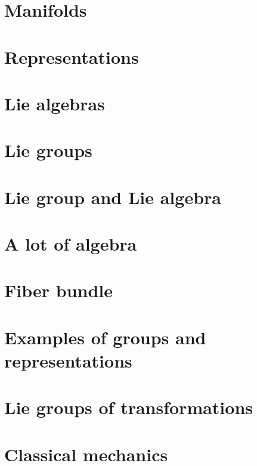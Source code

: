 \documentclass[a4paper,twoside,11pt]{book}
\begin{document}
\chapter{Manifolds} \label{Chapitre_FB}



\chapter{Representations}


\chapter{Lie algebras}







\chapter{Lie groups}


\chapter{Lie group and Lie algebra}


\chapter{A lot of algebra}




\chapter{Fiber bundle}



\chapter{Examples of groups and representations}        \label{ChapThoComsGroupes}





\chapter{Lie groups of transformations}


\chapter{Classical mechanics}

\end{document}
